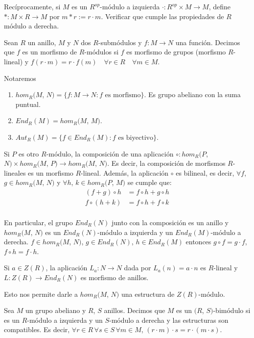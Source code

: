 Recíprocamente, si \(M\) es un \(R^{op}\)-módulo a izquierda \(\cdot : R^{op} \times M \to M\), define \(* : M \times R \to M\) por \(m * r := r \cdot m\). Verificar que cumple las propiedades de \(R\) módulo a derecha.

\begin{definition}
    Sean \(R\) un anillo, \(M\) y \(N\) dos \(R\)-submódulos y \(f : M \to N\) una función. Decimos que \(f\) es un morfismo de \(R\)-módulos si \(f\) es morfismo de grupos (morfismo \(R\)-lineal) y \(f(r \cdot m) = r \cdot f(m) \quad \forall r \in R \quad \forall m \in M\).
\end{definition}

Notaremos \begin{enumerate}
    \item \(hom_R(M\), \(N) = \{ f : M \to N : f \text{ es morfismo} \}\). Es grupo abeliano con la suma puntual.
    \item \(End_R(M) = hom_R(M\), \(M)\).
    \item \(Aut_R(M) = \{ f \in End_R(M) : f \text{ es biyectivo} \}\).
\end{enumerate}

\begin{note}
    Si \(P\) es otro \(R\)-módulo, la composición de una aplicación \(\circ : hom_R(P\), \(N) \times hom_R(M\), \(P) \to hom_R(M\), \(N)\). Es decir, la composición de morfismos \(R\)-lineales es un morfismo \(R\)-lineal.
    Además, la aplicación \(\circ\) es bilineal, es decir, \(\forall f\), \(g \in hom_R(M\), \(N)\) y \(\forall h\), \(k \in hom_R(P\), \(M)\) se cumple que:
    \begin{align*}
        (f + g) \circ h & = f \circ h + g \circ h \\
        f \circ (h + k) & = f \circ h + f \circ k \\
    \end{align*}
\end{note}

En particular, el grupo \(End_R(N)\) junto con la composición es un anillo y \(hom_R(M\), \(N)\) es un \(End_R(N)\)-módulo a izquierda y un \(End_R(M)\)-módulo a derecha.
\(f \in hom_R(M\), \(N)\), \(g \in End_R(N)\), \(h \in End_R(M)\) entonces \(g \circ f = g \cdot f\), \(f \circ h = f \cdot h\).

Si \(a \in Z(R)\), la aplicación \(L_a : N \to N\) dada por \(L_a(n) = a \cdot n\) es \(R\)-lineal y \(L: Z(R) \to End_R(N)\) es morfismo de anillos.

Esto nos permite darle a \(hom_R(M\), \(N)\) una estructura de \(Z(R)\)-módulo.

\begin{definition}
    Sea \(M\) un grupo abeliano y \(R\), \(S\) anillos. Decimos que \(M\) es un \((R\), \(S)\)-bimódulo si es un \(R\)-módulo a izquierda y un \(S\)-módulo a derecha y las estructuras son compatibles.
    Es decir, \(\forall r \in R \, \forall s \in S \, \forall m \in M\), \((r \cdot m) \cdot s = r \cdot (m \cdot s)\).
\end{definition}
